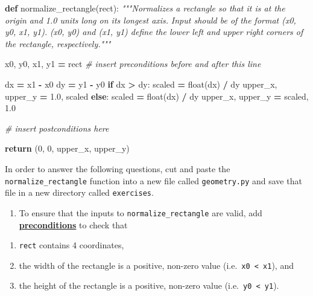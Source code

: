 \documentclass[
]{krantz}
\makeatletter
\newenvironment{Shaded}{\begin{snugshade}}{\end{snugshade}}
\newcommand{\BuiltInTok}[1]{#1}
\newcommand{\CommentTok}[1]{\textcolor[rgb]{0.56,0.35,0.01}{\textit{#1}}}
\newcommand{\ControlFlowTok}[1]{\textcolor[rgb]{0.13,0.29,0.53}{\textbf{#1}}}
\newcommand{\DecValTok}[1]{\textcolor[rgb]{0.00,0.00,0.81}{#1}}
\newcommand{\FloatTok}[1]{\textcolor[rgb]{0.00,0.00,0.81}{#1}}
\newcommand{\KeywordTok}[1]{\textcolor[rgb]{0.13,0.29,0.53}{\textbf{#1}}}
\newcommand{\NormalTok}[1]{#1}
\newcommand{\OperatorTok}[1]{\textcolor[rgb]{0.81,0.36,0.00}{\textbf{#1}}}
\providecommand{\tightlist}{%
  \setlength{\itemsep}{0pt}\setlength{\parskip}{0pt}}
\newenvironment{kframe}{%
\medskip{}
\setlength{\fboxsep}{.8em}
 \def\at@end@of@kframe{}%
 \ifinner\ifhmode%
  \def\at@end@of@kframe{\end{minipage}}%
  \begin{minipage}{\columnwidth}%
 \fi\fi%
 \def\FrameCommand##1{\hskip\@totalleftmargin \hskip-\fboxsep
 \colorbox{shadecolor}{##1}\hskip-\fboxsep
     \hskip-\linewidth \hskip-\@totalleftmargin \hskip\columnwidth}%
 \MakeFramed {\advance\hsize-\width
   \@totalleftmargin\z@ \linewidth\hsize
   \@setminipage}}%
 {\par\unskip\endMakeFramed%
 \at@end@of@kframe}
\renewenvironment{Shaded}{\begin{kframe}}{\end{kframe}}
\newcommand{\gref}[2]{\hyperlink{#2}{\textbf{#1}}}
\makeatother
\begin{document}
\begin{Shaded}
\begin{Highlighting}[]
\KeywordTok{def}\NormalTok{ normalize\_rectangle(rect):}
    \CommentTok{"""Normalizes a rectangle so that it is at the origin}
\CommentTok{    and 1.0 units long on its longest axis.}
\CommentTok{    Input should be of the format (x0, y0, x1, y1).}
\CommentTok{    (x0, y0) and (x1, y1) define the lower left and}
\CommentTok{    upper right corners of the rectangle, respectively."""}
    
\NormalTok{    x0, y0, x1, y1 }\OperatorTok{=}\NormalTok{ rect  }\CommentTok{\# insert preconditions before and after this line }
    
\NormalTok{    dx }\OperatorTok{=}\NormalTok{ x1 }\OperatorTok{{-}}\NormalTok{ x0}
\NormalTok{    dy }\OperatorTok{=}\NormalTok{ y1 }\OperatorTok{{-}}\NormalTok{ y0}
    \ControlFlowTok{if}\NormalTok{ dx }\OperatorTok{\textgreater{}}\NormalTok{ dy:}
\NormalTok{        scaled }\OperatorTok{=} \BuiltInTok{float}\NormalTok{(dx) }\OperatorTok{/}\NormalTok{ dy}
\NormalTok{        upper\_x, upper\_y }\OperatorTok{=} \FloatTok{1.0}\NormalTok{, scaled}
    \ControlFlowTok{else}\NormalTok{:}
\NormalTok{        scaled }\OperatorTok{=} \BuiltInTok{float}\NormalTok{(dx) }\OperatorTok{/}\NormalTok{ dy}
\NormalTok{        upper\_x, upper\_y }\OperatorTok{=}\NormalTok{ scaled, }\FloatTok{1.0}

    \CommentTok{\# insert postconditions here}

    \ControlFlowTok{return}\NormalTok{ (}\DecValTok{0}\NormalTok{, }\DecValTok{0}\NormalTok{, upper\_x, upper\_y)}
\end{Highlighting}
\end{Shaded}

In order to answer the following questions,
cut and paste the \texttt{normalize\_rectangle} function into a new file called \texttt{geometry.py} and
save that file in a new directory called \texttt{exercises}.

\begin{enumerate}
\def\labelenumi{\arabic{enumi}.}
\tightlist
\item
  To ensure that the inputs to \texttt{normalize\_rectangle} are valid,
  add \gref{preconditions}{precondition} to check that
\end{enumerate}

\begin{enumerate}
\def\labelenumi{(\alph{enumi})}
\tightlist
\item
  \texttt{rect} contains 4 coordinates,
\item
  the width of the rectangle is a positive, non-zero value (i.e.~\texttt{x0\ \textless{}\ x1}), and
\item
  the height of the rectangle is a positive, non-zero value (i.e.~\texttt{y0\ \textless{}\ y1}).
\end{enumerate}
\end{document}
